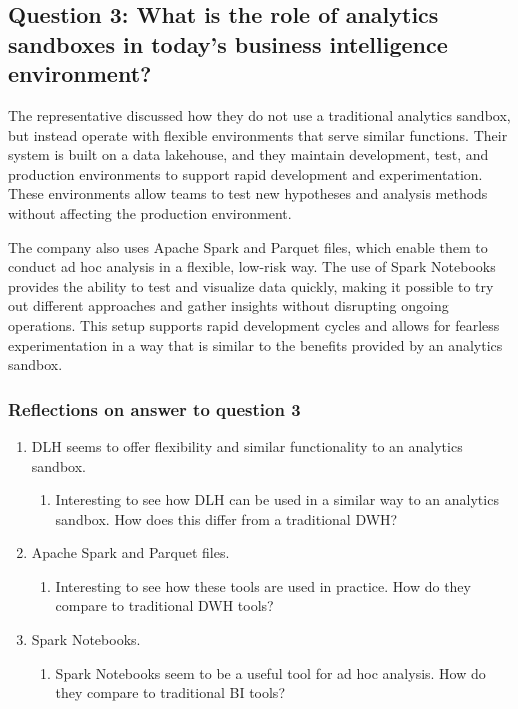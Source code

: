 \subsection{Question 3: What is the role of analytics sandboxes in today's business intelligence environment?} 

The representative discussed how they do not use a traditional analytics sandbox, but instead operate with flexible environments that 
serve similar functions. Their system is built on a data lakehouse, and they maintain development, test, and production environments 
to support rapid development and experimentation. These environments allow teams to test new hypotheses and analysis methods without 
affecting the production environment.

The company also uses Apache Spark and Parquet files, which enable them to conduct ad hoc analysis in a flexible, low-risk way. The 
use of Spark Notebooks provides the ability to test and visualize data quickly, making it possible to try out different approaches and 
gather insights without disrupting ongoing operations. This setup supports rapid development cycles and allows for fearless experimentation 
in a way that is similar to the benefits provided by an analytics sandbox.
\subsubsection{Reflections on answer to question 3}
\begin{enumerate}
    \item DLH seems to offer flexibility and similar functionality to an analytics sandbox.
    \begin{enumerate}
        \item Interesting to see how DLH can be used in a similar way to an analytics sandbox. How does this differ from a traditional DWH?
    \end{enumerate}
    \item Apache Spark and Parquet files.
    \begin{enumerate}
        \item Interesting to see how these tools are used in practice. How do they compare to traditional DWH tools?
    \end{enumerate}
    \item Spark Notebooks.
    \begin{enumerate}
        \item Spark Notebooks seem to be a useful tool for ad hoc analysis. How do they compare to traditional BI tools?
    \end{enumerate}
\end{enumerate}
